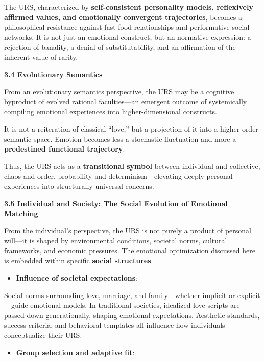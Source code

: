 \documentclass[
]{article}
\begin{document}
The URS, characterized by \textbf{self-consistent personality models,
reflexively affirmed values, and emotionally convergent trajectories},
becomes a philosophical resistance against fast-food relationships and
performative social networks. It is not just an emotional construct, but
an normative expression: a rejection of banality, a denial of
substitutability, and an affirmation of the inherent value of rarity.

\textbf{3.4 Evolutionary Semantics}

From an evolutionary semantics perspective, the URS may be a cognitive
byproduct of evolved rational faculties---an emergent outcome of
systemically compiling emotional experiences into higher-dimensional
constructs.

It is not a reiteration of classical ``love,'' but a projection of it
into a higher-order semantic space. Emotion becomes less a stochastic
fluctuation and more a \textbf{predestined functional trajectory}.

Thus, the URS acts as a \textbf{transitional symbol} between individual
and collective, chaos and order, probability and determinism---elevating
deeply personal experiences into structurally universal concerns.

\textbf{3.5 Individual and Society: The Social Evolution of Emotional
Matching}

From the individual's perspective, the URS is not purely a product of
personal will---it is shaped by environmental conditions, societal
norms, cultural frameworks, and economic pressures. The emotional
optimization discussed here is embedded within specific \textbf{social
structures}.

\begin{itemize}
\item
  \textbf{Influence of societal expectations}:
\end{itemize}

Social norms surrounding love, marriage, and family---whether implicit
or explicit---guide emotional models. In traditional societies,
idealized love scripts are passed down generationally, shaping emotional
expectations. Aesthetic standards, success criteria, and behavioral
templates all influence how individuals conceptualize their URS.

\begin{itemize}
\item
  \textbf{Group selection and adaptive fit}:
\end{itemize}
\end{document}
